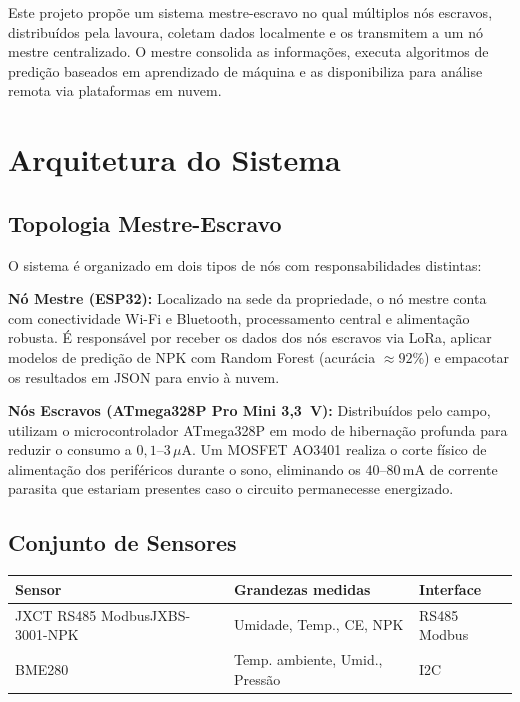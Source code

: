 \documentclass[12pt,a4paper]{article}
\begin{document}
Este projeto propõe um sistema mestre-escravo no qual múltiplos nós escravos,
distribuídos pela lavoura, coletam dados localmente e os transmitem a um nó mestre
centralizado. O mestre consolida as informações, executa algoritmos de predição
baseados em aprendizado de máquina e as disponibiliza para análise remota via
plataformas em nuvem.

\section{Arquitetura do Sistema}

\subsection{Topologia Mestre-Escravo}

O sistema é organizado em dois tipos de nós com responsabilidades distintas:

\textbf{Nó Mestre (ESP32):} Localizado na sede da propriedade, o nó mestre conta
com conectividade Wi-Fi e Bluetooth, processamento central e alimentação robusta.
É responsável por receber os dados dos nós escravos via LoRa, aplicar modelos de
predição de NPK com Random Forest (acurácia $\approx 92\%$) e empacotar os
resultados em JSON para envio à nuvem.

\textbf{Nós Escravos (ATmega328P Pro Mini 3,3~V):} Distribuídos pelo campo,
utilizam o microcontrolador ATmega328P em modo de hibernação profunda para reduzir
o consumo a $0{,}1$--$3\,\mu\text{A}$. Um MOSFET AO3401 realiza o corte físico de
alimentação dos periféricos durante o sono, eliminando os $40$--$80\,\text{mA}$
de corrente parasita que estariam presentes caso o circuito permanecesse energizado.

\subsection{Conjunto de Sensores}

\begin{center}
\begin{tabular}{lll}
\toprule
\textbf{Sensor} & \textbf{Grandezas medidas} & \textbf{Interface} \\
\midrule
JXCT RS485 ModbusJXBS-3001-NPK & Umidade, Temp., CE, NPK & RS485 Modbus \\
BME280 & Temp. ambiente, Umid., Pressão & I2C \\
\bottomrule
\end{tabular}
\end{center}
\end{document}
